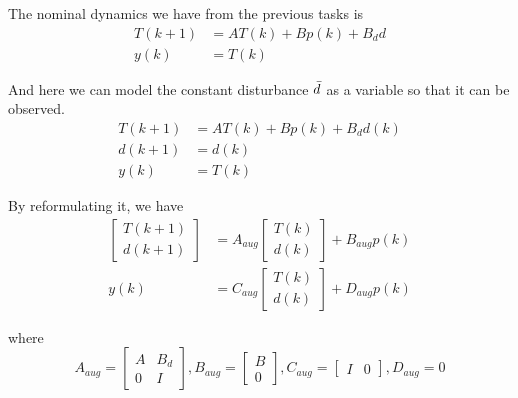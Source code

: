\documentclass[a4paper,twoside,11pt]{article}
\numberwithin{equation}{section}
\begin{document}
The nominal dynamics we have from the previous tasks is
\begin{equation}
    \begin{split}
        T(k+1) &= AT(k)+Bp(k)+B_d d \\
        y(k) &= T(k)
    \end{split}
\end{equation}

And here we can model the constant disturbance $\Bar{d}$ as a variable so that it can be observed. 
\begin{equation}
    \begin{split}
        T(k+1) &= AT(k)+Bp(k)+B_d d(k) \\
        d(k+1) &= d(k) \\
        y(k) &= T(k)
    \end{split}
\end{equation}

By reformulating it, we have
\begin{equation}
    \begin{split}
        \begin{bmatrix}
        T(k+1) \\
        d(k+1)
        \end{bmatrix}
        &=A_{aug}
        \begin{bmatrix}
        T(k) \\
        d(k)
        \end{bmatrix}
        +
        B_{aug}p(k) \\
        y(k) &=
        C_{aug}
        \begin{bmatrix}
        T(k) \\
        d(k)
        \end{bmatrix}
        + D_{aug}p(k)
    \end{split}
\end{equation}

where 
\begin{equation*}
    A_{aug} = \begin{bmatrix}
    A & B_d \\
    0 & I
    \end{bmatrix}, 
    B_{aug} = \begin{bmatrix}
    B \\
    0
    \end{bmatrix}, 
    C_{aug} = \begin{bmatrix}
    I & 0
    \end{bmatrix}, 
    D_{aug} = 0
\end{equation*}
\end{document}
